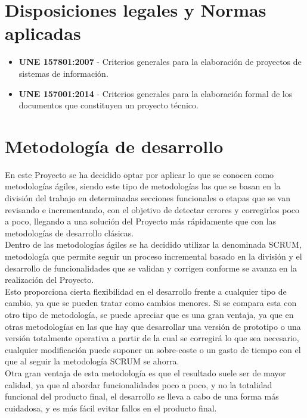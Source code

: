 \section{Disposiciones legales y Normas aplicadas}

\begin{itemize}
    \item \textbf{UNE 157801:2007} - Criterios generales para la elaboración de proyectos de sistemas de información.
    \item \textbf{UNE 157001:2014} - Criterios generales para la elaboración formal de los documentos que constituyen un proyecto técnico.
\end{itemize}

    
\nocite{*}



\section{Metodología de desarrollo}

En este Proyecto se ha decidido optar por aplicar lo que se conocen como metodologías ágiles, siendo este tipo de metodologías las que se basan en la división del trabajo en determinadas secciones funcionales o etapas que se van revisando e incrementando, con el objetivo de detectar errores y corregirlos poco a poco, llegando a una solución del Proyecto más rápidamente que con las metodologías de desarrollo clásicas. \\

Dentro de las metodologías ágiles se ha decidido utilizar la denominada SCRUM, metodología que permite seguir un proceso incremental basado en la división y el desarrollo de funcionalidades que se validan y corrigen conforme se avanza en la realización del Proyecto. \\

Esto proporciona cierta flexibilidad en el desarrollo frente a cualquier tipo de cambio, ya que se pueden tratar como cambios menores. Si se compara esta con otro tipo de metodología, se puede apreciar que es una gran ventaja, ya que en otras metodologías en las que hay que desarrollar una versión de prototipo o una versión totalmente operativa a partir de la cual se corregirá lo que sea necesario, cualquier modificación puede suponer un sobre-coste o un gasto de tiempo con el que al seguir la metodología SCRUM se ahorra. \\

Otra gran ventaja de esta metodología es que el resultado suele ser de mayor calidad, ya que al abordar funcionalidades poco a poco, y no la totalidad funcional del producto final, el desarrollo se lleva a cabo de una forma más cuidadosa, y es más fácil evitar fallos en el producto final. \\

